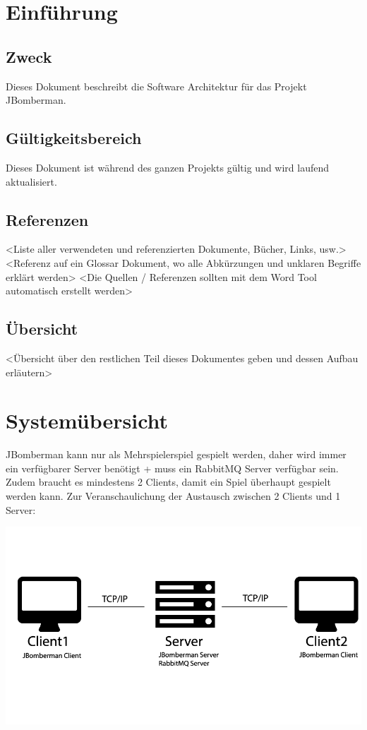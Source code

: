 \documentclass[11pt]{scrartcl}
\begin{document}
\newpage
\tableofcontents
\newpage

\section{Einführung}
\subsection{Zweck}
Dieses Dokument beschreibt die Software Architektur für das Projekt JBomberman.
\subsection{Gültigkeitsbereich}
Dieses Dokument ist während des ganzen Projekts gültig und wird laufend aktualisiert.
\subsection{Referenzen}
<Liste aller verwendeten und referenzierten Dokumente, Bücher, Links, usw.>
<Referenz auf ein Glossar Dokument, wo alle Abkürzungen und unklaren Begriffe erklärt werden>
<Die Quellen / Referenzen sollten mit dem Word Tool automatisch erstellt werden>
\subsection{Übersicht}
<Übersicht über den restlichen Teil dieses Dokumentes geben und dessen Aufbau erläutern>
 
\section{Systemübersicht}
JBomberman kann nur als Mehrspielerspiel gespielt werden, daher wird immer ein verfügbarer Server benötigt + muss ein RabbitMQ Server verfügbar sein.
Zudem braucht es mindestens 2 Clients, damit ein Spiel überhaupt gespielt werden kann.
Zur Veranschaulichung der Austausch zwischen 2 Clients und 1 Server:

\includegraphics[scale=0.45]{systemuebersicht}
\end{document}
